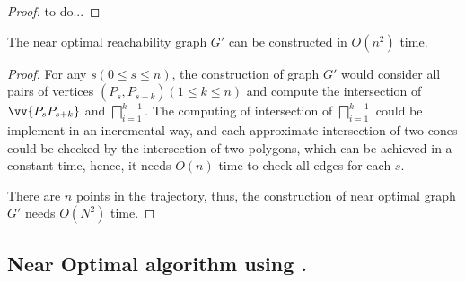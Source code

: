 \begin{proof}
	to do...
\end{proof}


\begin{prop}
	\label{prop-near-opt-graph-construction}
	The near optimal reachability graph $G'$ can be constructed in $O(n^2)$ time.
\end{prop}

\begin{proof}
For any $s (0\le s \le n)$, the construction of graph $G'$ would consider all pairs of vertices $(P_s,P_{s+k}) (1\le k \le n)$ and compute the intersection of $\vv{P_sP_{s+k}}$ and $\bigsqcap_{i=1}^{k - 1}$. 
The computing of intersection of $\bigsqcap_{i=1}^{k - 1}$ could be implement in an incremental way, and each approximate intersection of two cones could be checked by the intersection of two polygons, which can be achieved in a constant time, hence, it needs $O(n)$ time to check all edges for each $s$. 

There are $n$ points in the trajectory, thus, the construction of near optimal graph $G'$ needs $O(N^2)$ time.
\end{proof}





\subsection{Near Optimal algorithm using \sed.}

